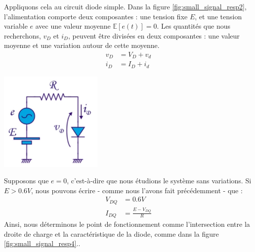 \begin{minipage}{.6\textwidth}
	Appliquons cela au circuit diode simple. Dans la figure \ref{fig:small_signal_resp2}, l'alimentation comporte deux composantes : une tension fixe $E$, et une tension variable $e$ avec une valeur moyenne $\mathds{E}[e(t)] = 0$. Les quantités que nous recherchons, $v_D$ et $i_D$, peuvent être divisées en deux composantes : une valeur moyenne et une variation autour de cette moyenne.
	\begin{equation}
		\begin{split}
			v_D &= V_D + v_d\\
			i_D &= I_D + i_d
		\end{split}
	\end{equation}
\end{minipage}
\begin{minipage}{.4\textwidth}
	\centering
	\includegraphics[width=5cm]{figures/ch02/small_signal_resp2.jpg}
	\label{fig:small_signal_resp2}
\end{minipage}

Supposons que $e=0$, c'est-à-dire que nous étudions le système sans variations. Si $E>0.6V$, nous pouvons écrire - comme nous l'avons fait précédemment - que :
\begin{equation}
	\begin{split}
		V_{DQ} &= 0.6V\\
		I_{DQ} &= \frac{E-V_{DQ}}{R}
	\end{split}
\end{equation}
Ainsi, nous déterminons le point de fonctionnement comme l'intersection entre la droite de charge et la caractéristique de la diode, comme dans la figure \ref{fig:small_signal_resp4}..

